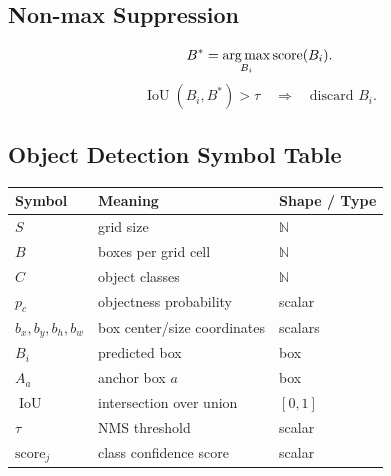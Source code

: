 \subsection{Non-max Suppression}

\[
B^*
=
\operatorname*{arg\,max}_{B_i}
\mathrm{score}(B_i).
\]
\[
\operatorname{IoU}(B_i,B^*) > \tau
\quad
\Rightarrow
\quad
\text{discard } B_i.
\]

\subsection{Object Detection Symbol Table}

\begin{center}
\begin{tabular}{lll}
\toprule
Symbol & Meaning & Shape / Type \\
\midrule
$S$ & grid size & $\mathbb{N}$ \\
$B$ & boxes per grid cell & $\mathbb{N}$ \\
$C$ & object classes & $\mathbb{N}$ \\
$p_c$ & objectness probability & scalar \\
$b_x,b_y,b_h,b_w$ & box center/size coordinates & scalars \\
$B_i$ & predicted box & box \\
$A_a$ & anchor box $a$ & box \\
$\operatorname{IoU}$ & intersection over union & $[0,1]$ \\
$\tau$ & NMS threshold & scalar \\
$\mathrm{score}_j$ & class confidence score & scalar \\
\bottomrule
\end{tabular}
\end{center}
